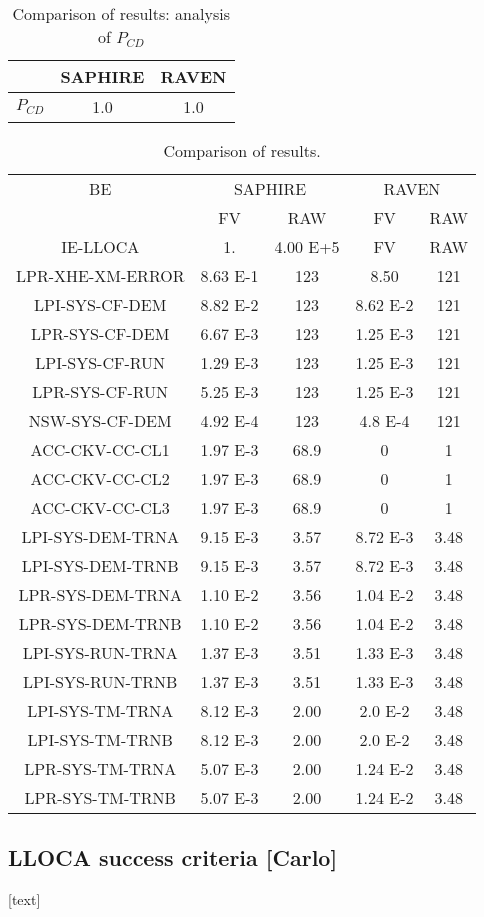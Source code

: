 \begin{table}
  \caption{Comparison of results: analysis of $P_{CD}$}
  \label{tab:case1_P_CD}
  \centering
  \begin{tabular}{c | c | c } 
    \hline 
             & SAPHIRE & RAVEN \\ 
    \hline 
    $P_{CD}$ & 1.0     & 1.0   \\
    \hline 
  \end{tabular}
\end{table}


\begin{table}
	\centering
	\label{tab:case1_RIMs}
	\caption{Comparison of results.}
	\begin{tabular}{*5c}
		\hline
		BE &  \multicolumn{2}{c}{SAPHIRE}     & \multicolumn{2}{c}{RAVEN}\\
		{}               &  FV        &  RAW       &  FV        &  RAW        \\
		\hline
	    IE-LLOCA         &  1.        &  4.00 E+5  &  FV        & RAW  \\ 
	    LPR-XHE-XM-ERROR &  8.63 E-1  &  123       &  8.50      & 121  \\
	    LPI-SYS-CF-DEM   &  8.82 E-2  &  123       &  8.62 E-2  & 121  \\ 
	    LPR-SYS-CF-DEM   &  6.67 E-3  &  123       &  1.25 E-3  & 121  \\ 
	    LPI-SYS-CF-RUN   &  1.29 E-3  &  123       &  1.25 E-3  & 121  \\
	    LPR-SYS-CF-RUN   &  5.25 E-3  &  123       &  1.25 E-3  & 121  \\
	    NSW-SYS-CF-DEM   &  4.92 E-4  &  123       &  4.8 E-4   & 121  \\
	    ACC-CKV-CC-CL1   &  1.97 E-3  &  68.9      &  0         & 1  \\
	    ACC-CKV-CC-CL2   &  1.97 E-3  &  68.9      &  0         & 1  \\
	    ACC-CKV-CC-CL3   &  1.97 E-3  &  68.9      &  0         & 1  \\
	    LPI-SYS-DEM-TRNA &  9.15 E-3  &  3.57      &  8.72 E-3  & 3.48  \\
	    LPI-SYS-DEM-TRNB &  9.15 E-3  &  3.57      &  8.72 E-3  & 3.48  \\
	    LPR-SYS-DEM-TRNA &  1.10 E-2  &  3.56      &  1.04 E-2  & 3.48  \\
	    LPR-SYS-DEM-TRNB &  1.10 E-2  &  3.56      &  1.04 E-2  & 3.48  \\
	    LPI-SYS-RUN-TRNA &  1.37 E-3  &  3.51      &  1.33 E-3  & 3.48  \\
	    LPI-SYS-RUN-TRNB &  1.37 E-3  &  3.51      &  1.33 E-3  & 3.48  \\
	    LPI-SYS-TM-TRNA  &  8.12 E-3  &  2.00      &  2.0 E-2   & 3.48  \\
	    LPI-SYS-TM-TRNB  &  8.12 E-3  &  2.00      &  2.0 E-2   & 3.48  \\
	    LPR-SYS-TM-TRNA  &  5.07 E-3  &  2.00      &  1.24 E-2  & 3.48  \\
	    LPR-SYS-TM-TRNB  &  5.07 E-3  &  2.00      &  1.24 E-2  & 3.48  \\
		\hline
	\end{tabular}
\end{table}


\subsection{LLOCA success criteria [Carlo]}

[text]

